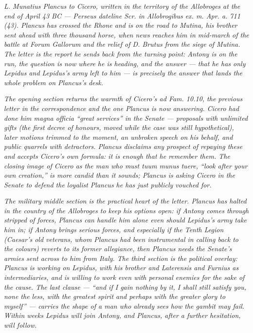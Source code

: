 
\textit{L. Munatius Plancus to Cicero, written in the territory
of the Allobroges at the end of April 43 BC --- Perseus dateline
\textit{Scr. in Allobrogibus ex. m. Apr. a. 711 (43)}. Plancus
has crossed the Rhone and is on the road to Mutina, his brother
sent ahead with three thousand horse, when news reaches him in
mid-march of the battle at Forum Gallorum and the relief of D.
Brutus from the siege of Mutina. The letter is the report he
sends back from the turning point: Antony is on the run, the
question is now where he is heading, and the answer --- that he
has only Lepidus and Lepidus's army left to him --- is precisely
the answer that lands the whole problem on Plancus's desk.}

\textit{The opening section returns the warmth of Cicero's
\textit{ad Fam.} 10.10, the previous letter in the
correspondence and the one Plancus is now answering. Cicero had
done him \textit{magna officia} ``great services'' in the Senate
--- proposals with unlimited gifts (the first decree of honours,
moved while the case was still hypothetical), later motions
trimmed to the moment, an unbroken speech on his behalf, and
public quarrels with detractors. Plancus disclaims any prospect
of repaying these and accepts Cicero's own formula: it is
enough that he remember them. The closing image of Cicero as
the man who must \textit{tuum munus tuere}, ``look after your
own creation,'' is more candid than it sounds; Plancus is
asking Cicero in the Senate to defend the loyalist Plancus he
has just publicly vouched for.}

\textit{The military middle section is the practical heart of
the letter. Plancus has halted in the country of the Allobroges
to keep his options open: if Antony comes through stripped of
forces, Plancus can handle him alone even should Lepidus's army
take him in; if Antony brings serious forces, and especially if
the Tenth Legion (Caesar's old veterans, whom Plancus had been
instrumental in calling back to the colours) reverts to its
former allegiance, then Plancus needs the Senate's armies sent
across to him from Italy. The third section is the political
overlay: Plancus is working on Lepidus, with his brother and
Laterensis and Furnius as intermediaries, and is willing to
work even with personal enemies for the sake of the cause. The
last clause --- ``and if I gain nothing by it, I shall still
satisfy you, none the less, with the greatest spirit and
perhaps with the greater glory to myself'' --- carries the
shape of a man who already sees how the gambit may fail. Within
weeks Lepidus will join Antony, and Plancus, after a further
hesitation, will follow.}
